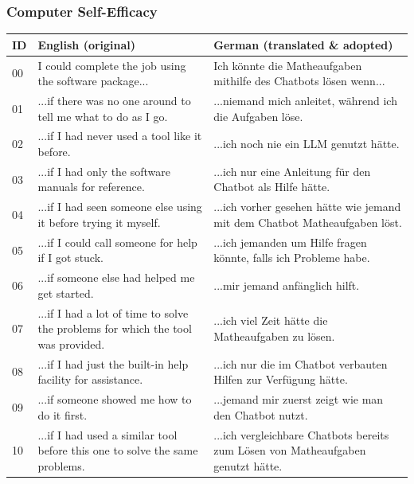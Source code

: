 \clearpage
\subsubsection*{Computer Self-Efficacy}

\begin{ctable}
    \begin{tabularx}{\textwidth}{l X X}
        \toprule
        \textbf{ID} & \textbf{English} (original) & \textbf{German} (translated \& adopted) \\
        \midrule
        00 & I could complete the job using the software package... & Ich könnte die Matheaufgaben mithilfe des Chatbots lösen wenn... \\
        01 & ...if there was no one around to tell me what to do as I go. & ...niemand mich anleitet, während ich die Aufgaben löse. \\
        02 & ...if I had never used a tool like it before. & ...ich noch nie ein \ac{LLM} genutzt hätte. \\
        03 & ...if I had only the software manuals for reference. & ...ich nur eine Anleitung für den Chatbot als Hilfe hätte. \\
        04 & ...if I had seen someone else using it before trying it myself. & ...ich vorher gesehen hätte wie jemand mit dem Chatbot Matheaufgaben löst. \\
        05 & ...if I could call someone for help if I got stuck. & ...ich jemanden um Hilfe fragen könnte, falls ich Probleme habe. \\
        06 & ...if someone else had helped me get started. & ...mir jemand anfänglich hilft. \\
        07 & ...if I had a lot of time to solve the problems for which the tool was provided. & ...ich viel Zeit hätte die Matheaufgaben zu lösen. \\
        08 & ...if I had just the built-in help facility for assistance. & ...ich nur die im Chatbot verbauten Hilfen zur Verfügung hätte. \\
        09 & ...if someone showed me how to do it first. & ...jemand mir zuerst zeigt wie man den Chatbot nutzt. \\
        10 & ...if I had used a similar tool before this one to solve the same problems. & ...ich vergleichbare Chatbots bereits zum Lösen von Matheaufgaben genutzt hätte. \\
        \bottomrule
    \end{tabularx}
\end{ctable}

